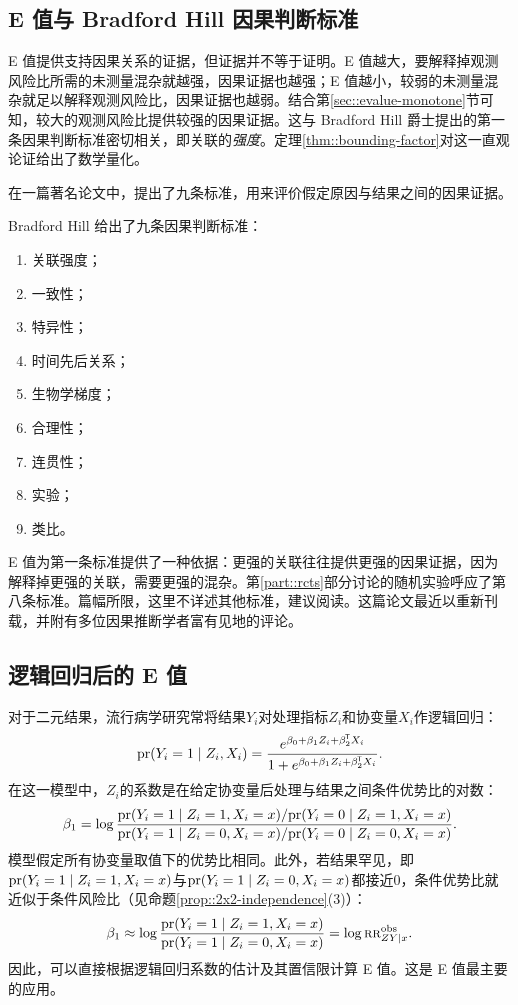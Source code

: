 \subsection{E 值与 Bradford Hill 因果判断标准}

E 值提供支持因果关系的证据，但证据并不等于证明。E 值越大，要解释掉观测风险比所需的未测量混杂就越强，因果证据也越强；E 值越小，较弱的未测量混杂就足以解释观测风险比，因果证据也越弱。结合第\ref{sec::evalue-monotone}节可知，较大的观测风险比提供较强的因果证据。这与 Bradford Hill 爵士提出的第一条因果判断标准密切相关，即关联的{\it 强度}\citep{hill1965environment}。定理\ref{thm::bounding-factor}对这一直观论证给出了数学量化。 


在一篇著名论文中，\citet{hill1965environment}提出了九条标准，用来评价假定原因与结果之间的因果证据。


\begin{definition}\label{def::hill-causation}
Bradford Hill 给出了九条因果判断标准：
\begin{enumerate}
\item
关联强度；
\item
一致性；
\item
特异性；
\item
时间先后关系；
\item
生物学梯度；
\item
合理性；
\item
连贯性；
\item
实验；
\item
类比。
\end{enumerate}
\end{definition}


E 值为第一条标准提供了一种依据：更强的关联往往提供更强的因果证据，因为解释掉更强的关联，需要更强的混杂。第\ref{part::rcts}部分讨论的随机实验呼应了第八条标准。篇幅所限，这里不详述其他标准，建议阅读\citet{hill1965environment}。这篇论文最近以\citet{hill2020environment}重新刊载，并附有多位因果推断学者富有见地的评论。 




\subsection{逻辑回归后的 E 值}

对于二元结果，流行病学研究常将结果$Y_i$对处理指标$Z_i$和协变量$X_i$作逻辑回归：
$$
\textup{pr}(Y_i = 1\mid Z_i, X_i) = \frac{  e^{\beta_0 + \beta_1 Z_i + \beta_2^{\mkern-1.5mu\mathsf{T}} X_i}  }{1  + e^{\beta_0 + \beta_1 Z_i + \beta_2^{\mkern-1.5mu\mathsf{T}} X_i}} .
$$
在这一模型中，$Z_i$的系数是在给定协变量后处理与结果之间条件优势比的对数：
$$
\beta_1 = \log \frac{   \textup{pr}(Y_i=1\mid Z_i =1, X_i=x)/  \textup{pr}(Y_i=0\mid Z_i =1, X_i=x)  }
{  \textup{pr}(Y_i=1\mid Z_i =0, X_i=x)/  \textup{pr}(Y_i=0\mid Z_i =0, X_i=x)  }  .
$$
模型假定所有协变量取值下的优势比相同。此外，若结果罕见，即$ \textup{pr}(Y_i=1\mid Z_i =1, X_i=x)$与$\textup{pr}(Y_i=1\mid Z_i =0, X_i=x)$都接近$0$，条件优势比就近似于条件风险比（见命题\ref{prop::2x2-independence}(3)）：
$$
\beta_1  \approx \log  \frac{   \textup{pr}(Y_i=1\mid Z_i =1, X_i=x)  }
{  \textup{pr}(Y_i=1\mid Z_i =0, X_i=x)  } = \log   \textsc{rr}_{ZY\mid x}^{\textup{obs}}.
$$
因此，可以直接根据逻辑回归系数的估计及其置信限计算 E 值。这是 E 值最主要的应用。 




